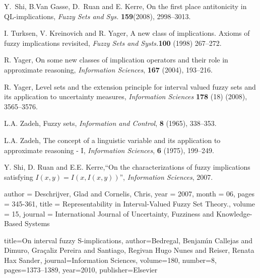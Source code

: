 \documentclass[12pt]{article}
\theoremstyle{plain}
\theoremstyle{remark}
\theoremstyle{definition}
\theoremstyle{proposition}
\begin{document}
\begin{thebibliography}{8}
{
Y.~Shi, B.Van Gasse, D.~Ruan and E. Kerre, On the first place
anti\-tonicity in QL-implications,\hspace{-0.1cm} \emph{Fuzzy Sets and Sys.}
\textbf{159}\hspace{-0.1cm}(2008),\hspace{-0.1cm} 2998--3013.


I. Turksen, V. Kreinovich and R. Yager, A new class of implications. Axioms of fuzzy implications revisited, \emph{Fuzzy Sets and Systs.}\textbf{100} (1998) 267--272.



R. Yager, On some new classes of implication operators and their role in
  approximate reasoning, \emph{Information Sciences}, \textbf{167} (2004),  193--216.

 R. Yager, Level sets and the extension principle for interval
valued fuzzy sets and its application to uncertainty measures,
 \emph{Information Sciences} \textbf{178} (18) (2008), 3565--3576.

L.A. Zadeh, Fuzzy sets, \emph{Information and Control}, \textbf{8} (1965),  338--353.


L.A. Zadeh, The concept of a linguistic variable and its application to
  approximate reasoning - {I}, \emph{Information Sciences}, \textbf{6} (1975),  199--249.}

 Y. Shi, D. Ruan and E.E. Kerre,``On the characterizations of fuzzy implications
satisfying $I(x,y)=I(x,I(x,y))$'', {\it Information Sciences},
2007.

author = {Deschrijver, Glad and Cornelis, Chris},
year = {2007},
month = {06},
pages = {345-361},
title = {Representability in Interval-Valued Fuzzy Set Theory.},
volume = {15},
journal = {International Journal of Uncertainty, Fuzziness and Knowledge-Based Systems}

  title={On interval fuzzy S-implications},
  author={Bedregal, Benjam{\'\i}n Callejas and Dimuro, Gra{\c{c}}aliz Pereira and Santiago, Regivan Hugo Nunes and Reiser, Renata Hax Sander},
  journal={Information Sciences},
  volume={180},
  number={8},
  pages={1373--1389},
  year={2010},
  publisher={Elsevier}


\end{thebibliography}

\end{document}
